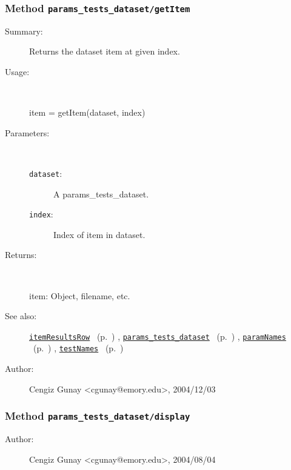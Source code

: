 \subsubsection[Method \texttt{getItem}]{Method \texttt{params\_tests\_dataset/getItem}}%
%
\label{ref_params_tests_dataset__getItem}%
\hypertarget{ref_params_tests_dataset__getItem}{}%
\begin{description}
\item[Summary:]Returns the dataset item at given index.
%
\item[Usage:]~%
\begin{lyxcode}%
item = getItem(dataset, index)
%
\end{lyxcode}%
%
%
\item[Parameters:]~
\begin{description}%
\item[\texttt{dataset}:]
 A params\_tests\_dataset.
\item[\texttt{index}:]
 Index of item in dataset.
\end{description}%
%
\item[Returns:]~

	item: Object, filename, etc.
%
%
\item[See also:]%
\hyperlink{ref_itemResultsRow}{\texttt{itemResultsRow}}%
\ (p.~\pageref{ref_itemResultsRow})%
%
, \hyperlink{ref_params_tests_dataset}{\texttt{params\_tests\_dataset}}%
\ (p.~\pageref{ref_params_tests_dataset})%
%
, \hyperlink{ref_paramNames}{\texttt{paramNames}}%
\ (p.~\pageref{ref_paramNames})%
%
, \hyperlink{ref_testNames}{\texttt{testNames}}%
\ (p.~\pageref{ref_testNames})%
%
%
\item[Author:]%
Cengiz Gunay <cgunay@emory.edu>, 2004/12/03%
\end{description}
\methodline%
\subsubsection[Method \texttt{display}]{Method \texttt{params\_tests\_dataset/display}}%
%
\label{ref_params_tests_dataset__display}%
\hypertarget{ref_params_tests_dataset__display}{}%
\begin{description}
%
%
%
%
%
%
%
\item[Author:]%
Cengiz Gunay <cgunay@emory.edu>, 2004/08/04%
\end{description}
\methodline%
